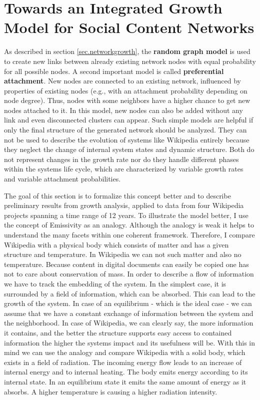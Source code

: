 \documentclass[a4paper,10pt]{scrbook}
\begin{document}
 
\section{Towards an Integrated Growth Model for Social Content Networks}

As described in section \ref{sec.networkgrowth}, the \textbf{random graph model} is used to create new links between already existing network nodes with equal probability for all possible nodes. A second important model is called \textbf{preferential attachment}. New nodes are connected to an existing network, influenced by properties of existing nodes (e.g., with an attachment probability depending on node degree). Thus, nodes with some neighbors have a higher chance to get new nodes attached to it. In this model, new nodes can also be added without any link and even disconnected clusters can appear. Such simple models are helpful if only the final structure of the generated network should be analyzed. They can not be used to describe the evolution of systems like Wikipedia entirely because they neglect the change of internal system states and dynamic structure. Both do not represent changes in the growth rate nor do they handle different phases within the systems life cycle, which are characterized by variable growth rates and variable attachment probabilities.

%

The goal of this section is to formalize this concept better and to describe preliminary results from growth analysis, applied to data from four Wikipedia projects spanning a time range of 12 years. To illustrate the model better, I use the concept of Emissivity as an analogy. Although the analogy is weak it helps to understand the many facets within one coherent framework. Therefore, I compare Wikipedia with a physical body which consists of matter and has a given structure and temperature. In Wikipedia we can not such matter and also no temperature. Because content in digital documents can easily be copied one has not to care about conservation of mass. In order to describe a flow of information we have to track the embedding of the system. In the simplest case, it is surrounded by a field of information, which can be absorbed. This can lead to the growth of the system. In case of an equilibrium - which is the ideal case - we can assume that we have a constant exchange of information between the system and the neighborhood. In case of Wikipedia, we can clearly say, the more information it contains, and the better the structure supports easy access to contained information the higher the systems impact and its usefulness will be. With this in mind we can use the analogy and compare Wikipedia with a solid body, which exists in a field of radiation. The incoming energy flow leads to an increase of internal energy and to internal heating. The body emits energy according to its internal state. In an equilibrium state it emits the same amount of energy as it absorbs. A higher temperature is causing a higher radiation intensity.
\end{document}
